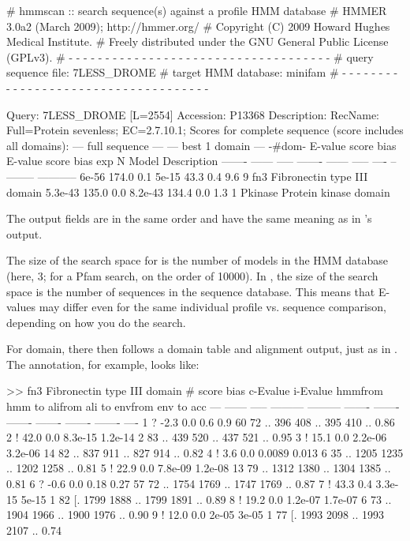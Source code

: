 \begin{sreoutput}
# hmmscan :: search sequence(s) against a profile HMM database
# HMMER 3.0a2 (March 2009); http://hmmer.org/
# Copyright (C) 2009 Howard Hughes Medical Institute.
# Freely distributed under the GNU General Public License (GPLv3).
# - - - - - - - - - - - - - - - - - - - - - - - - - - - - - - - - - - - -
# query sequence file:             7LESS_DROME
# target HMM database:             minifam
# - - - - - - - - - - - - - - - - - - - - - - - - - - - - - - - - - - - -

Query:       7LESS_DROME  [L=2554]
Accession:   P13368
Description: RecName: Full=Protein sevenless;          EC=2.7.10.1;
Scores for complete sequence (score includes all domains):
   --- full sequence ---   --- best 1 domain ---    -#dom-
    E-value  score  bias    E-value  score  bias    exp  N  Model    Description
    ------- ------ -----    ------- ------ -----   ---- --  -------- -----------
      6e-56  174.0   0.1      5e-15   43.3   0.4    9.6  9  fn3      Fibronectin type III domain
    5.3e-43  135.0   0.0    8.2e-43  134.4   0.0    1.3  1  Pkinase  Protein kinase domain
\end{sreoutput}

The output fields are in the same order and have the same meaning as
in 's output. 

The size of the search space for  is the number of
models in the HMM database (here, 3; for a Pfam search, on the order
of 10000). In , the size of the search space is the
number of sequences in the sequence database. This means that E-values
may differ even for the same individual profile vs. sequence
comparison, depending on how you do the search.

For domain, there then follows a domain table and alignment output,
just as in . The  annotation, for example,
looks like:

\begin{sreoutput}
>> fn3  Fibronectin type III domain
   #    score  bias  c-Evalue  i-Evalue hmmfrom  hmm to    alifrom  ali to    envfrom  env to     acc
 ---   ------ ----- --------- --------- ------- -------    ------- -------    ------- -------    ----
   1 ?   -2.3   0.0       0.6       0.9      60      72 ..     396     408 ..     395     410 .. 0.86
   2 !   42.0   0.0   8.3e-15   1.2e-14       2      83 ..     439     520 ..     437     521 .. 0.95
   3 !   15.1   0.0   2.2e-06   3.2e-06      14      82 ..     837     911 ..     827     914 .. 0.82
   4 !    3.6   0.0    0.0089     0.013       6      35 ..    1205    1235 ..    1202    1258 .. 0.81
   5 !   22.9   0.0   7.8e-09   1.2e-08      13      79 ..    1312    1380 ..    1304    1385 .. 0.81
   6 ?   -0.6   0.0      0.18      0.27      57      72 ..    1754    1769 ..    1747    1769 .. 0.87
   7 !   43.3   0.4   3.3e-15     5e-15       1      82 [.    1799    1888 ..    1799    1891 .. 0.89
   8 !   19.2   0.0   1.2e-07   1.7e-07       6      73 ..    1904    1966 ..    1900    1976 .. 0.90
   9 !   12.0   0.0     2e-05     3e-05       1      77 [.    1993    2098 ..    1993    2107 .. 0.74
\end{sreoutput}

